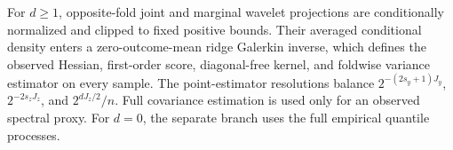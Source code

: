 For \(d\ge1\), opposite-fold joint and marginal wavelet projections are conditionally normalized and clipped to fixed positive bounds. Their averaged conditional density enters a zero-outcome-mean ridge Galerkin inverse, which defines the observed Hessian, first-order score, diagonal-free kernel, and foldwise variance estimator on every sample. The point-estimator resolutions balance \(2^{-(2s_y+1)J_y}\), \(2^{-2s_zJ_z}\), and \(2^{dJ_z/2}/n\). Full covariance estimation is used only for an observed spectral proxy. For \(d=0\), the separate branch uses the full empirical quantile processes.